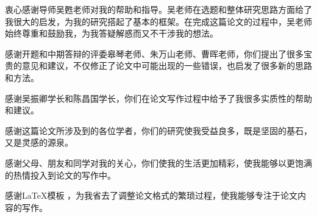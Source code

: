 

\begin{ack}

衷心感谢导师吴甦老师对我的帮助和指导。吴老师在选题和整体研究思路方面给了我很大的启发，为我的研究搭起了基本的框架。在完成这篇论文的过程中，吴老师始终尊重和鼓励我，为我答疑解惑而又不干涉我的想法。

感谢开题和中期答辩的评委皋琴老师、朱万山老师、曹晖老师，你们提出了很多宝贵的意见和建议，不仅修正了论文中可能出现的一些错误，也启发了很多新的思路和方法。

感谢吴振卿学长和陈昌国学长，你们在论文写作过程中给予了我很多实质性的帮助和建议。

感谢这篇论文所涉及到的各位学者，你们的研究使我受益良多，既是坚固的基石，又是灵感的源泉。

感谢父母、朋友和同学对我的关心，你们使我的生活更加精彩，使我能够以更饱满的热情投入到论文的写作中。

感谢\LaTeX 模板 \thuthesis，为我省去了调整论文格式的繁琐过程，使我能够专注于论文内容的写作。

\end{ack}
